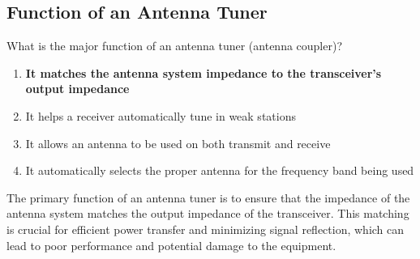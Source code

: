 \subsection{Function of an Antenna Tuner}
\label{T9B04}

\begin{tcolorbox}[colback=gray!10!white,colframe=black!75!black,title=T9B04]
What is the major function of an antenna tuner (antenna coupler)?
\begin{enumerate}[noitemsep]
    \item \textbf{It matches the antenna system impedance to the transceiver's output impedance}
    \item It helps a receiver automatically tune in weak stations
    \item It allows an antenna to be used on both transmit and receive
    \item It automatically selects the proper antenna for the frequency band being used
\end{enumerate}
\end{tcolorbox}

The primary function of an antenna tuner is to ensure that the impedance of the antenna system matches the output impedance of the transceiver. This matching is crucial for efficient power transfer and minimizing signal reflection, which can lead to poor performance and potential damage to the equipment.